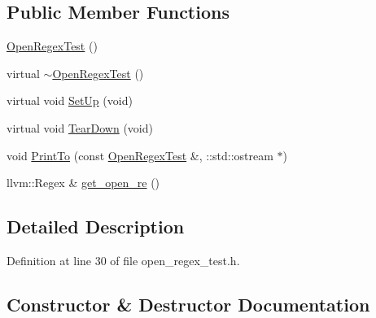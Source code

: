 \subsection*{Public Member Functions}
\begin{DoxyCompactItemize}
\item 
\hyperlink{classclang_1_1tidy_1_1pagesjaunes_1_1test_1_1_open_regex_test_a62f2d493d4cea0690aeb1f06e7ca2828}{Open\+Regex\+Test} ()
\item 
virtual \hyperlink{classclang_1_1tidy_1_1pagesjaunes_1_1test_1_1_open_regex_test_a4024a1b80a3031fca3c3f19f583be175}{$\sim$\+Open\+Regex\+Test} ()
\item 
virtual void \hyperlink{classclang_1_1tidy_1_1pagesjaunes_1_1test_1_1_open_regex_test_a6e06a613fbaaa3b8bc6e7e3c687c53ab}{Set\+Up} (void)
\item 
virtual void \hyperlink{classclang_1_1tidy_1_1pagesjaunes_1_1test_1_1_open_regex_test_a82384f4696f9f714c55a3ef10a4ac506}{Tear\+Down} (void)
\item 
void \hyperlink{classclang_1_1tidy_1_1pagesjaunes_1_1test_1_1_open_regex_test_a9ce37b59921fd03e11ab578196ed27c4}{Print\+To} (const \hyperlink{classclang_1_1tidy_1_1pagesjaunes_1_1test_1_1_open_regex_test}{Open\+Regex\+Test} \&, \+::std\+::ostream $\ast$)
\item 
llvm\+::\+Regex \& \hyperlink{classclang_1_1tidy_1_1pagesjaunes_1_1test_1_1_open_regex_test_a6ff695054d66cd4411d9fae421abccd1}{get\+\_\+open\+\_\+re} ()
\end{DoxyCompactItemize}


\subsection{Detailed Description}


Definition at line 30 of file open\+\_\+regex\+\_\+test.\+h.



\subsection{Constructor \& Destructor Documentation}
\mbox{\label{classclang_1_1tidy_1_1pagesjaunes_1_1test_1_1_open_regex_test_a62f2d493d4cea0690aeb1f06e7ca2828}} 
